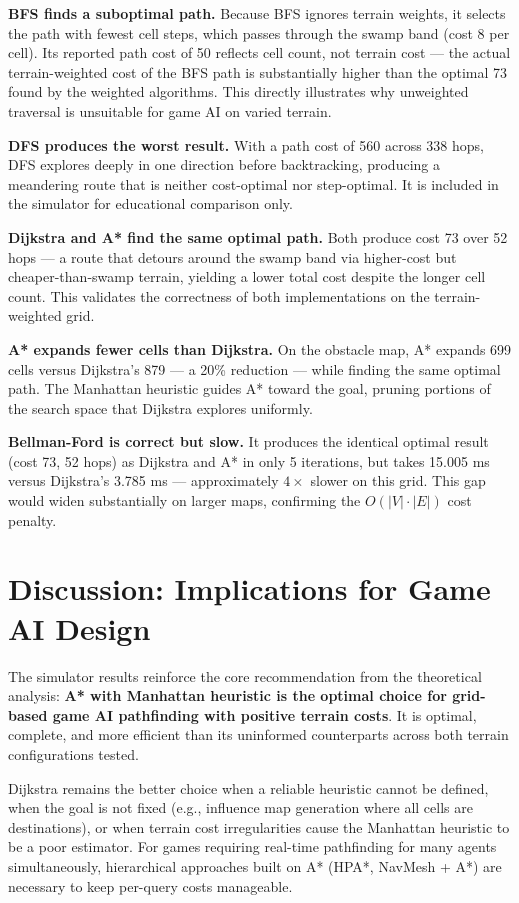 \documentclass[12pt, a4paper, oneside]{report}
\theoremstyle{definition}
\begin{document}
\textbf{BFS finds a suboptimal path.} Because BFS ignores terrain weights, it selects the path with fewest cell steps, which passes through the swamp band (cost 8 per cell). Its reported path cost of 50 reflects cell count, not terrain cost — the actual terrain-weighted cost of the BFS path is substantially higher than the optimal 73 found by the weighted algorithms. This directly illustrates why unweighted traversal is unsuitable for game AI on varied terrain.

\textbf{DFS produces the worst result.} With a path cost of 560 across 338 hops, DFS explores deeply in one direction before backtracking, producing a meandering route that is neither cost-optimal nor step-optimal. It is included in the simulator for educational comparison only.

\textbf{Dijkstra and A* find the same optimal path.} Both produce cost 73 over 52 hops — a route that detours around the swamp band via higher-cost but cheaper-than-swamp terrain, yielding a lower total cost despite the longer cell count. This validates the correctness of both implementations on the terrain-weighted grid.

\textbf{A* expands fewer cells than Dijkstra.} On the obstacle map, A* expands 699 cells versus Dijkstra's 879 — a 20\% reduction — while finding the same optimal path. The Manhattan heuristic guides A* toward the goal, pruning portions of the search space that Dijkstra explores uniformly.

\textbf{Bellman-Ford is correct but slow.} It produces the identical optimal result (cost 73, 52 hops) as Dijkstra and A* in only 5 iterations, but takes 15.005 ms versus Dijkstra's 3.785 ms — approximately $4\times$ slower on this grid. This gap would widen substantially on larger maps, confirming the $O(|V| \cdot |E|)$ cost penalty.

\section{Discussion: Implications for Game AI Design}

The simulator results reinforce the core recommendation from the theoretical analysis: \textbf{A* with Manhattan heuristic is the optimal choice for grid-based game AI pathfinding with positive terrain costs}. It is optimal, complete, and more efficient than its uninformed counterparts across both terrain configurations tested.

Dijkstra remains the better choice when a reliable heuristic cannot be defined, when the goal is not fixed (e.g., influence map generation where all cells are destinations), or when terrain cost irregularities cause the Manhattan heuristic to be a poor estimator. For games requiring real-time pathfinding for many agents simultaneously, hierarchical approaches built on A* (HPA*, NavMesh + A*) are necessary to keep per-query costs manageable.
\end{document}
